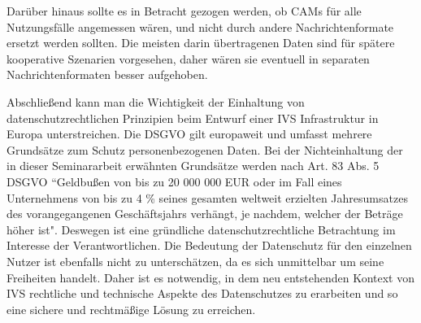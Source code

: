 Darüber hinaus sollte es in Betracht gezogen werden, ob CAMs für alle Nutzungsfälle angemessen wären, und nicht durch andere Nachrichtenformate ersetzt werden sollten. Die meisten darin übertragenen Daten sind für spätere kooperative Szenarien vorgesehen, daher wären sie eventuell in separaten Nachrichtenformaten besser aufgehoben. 

Abschließend kann man die Wichtigkeit der Einhaltung von datenschutzrechtlichen Prinzipien beim Entwurf einer IVS Infrastruktur in Europa unterstreichen. Die DSGVO gilt europaweit und umfasst mehrere Grundsätze zum Schutz personenbezogenen Daten. Bei der Nichteinhaltung der in dieser Seminararbeit erwähnten Grundsätze werden nach Art. 83 Abs. 5 DSGVO ``Geldbußen von bis zu 20 000 000 EUR oder im Fall eines Unternehmens von bis zu 4 \% seines gesamten weltweit erzielten Jahresumsatzes des vorangegangenen Geschäftsjahrs verhängt, je nachdem, welcher der Beträge höher ist". Deswegen ist eine gründliche datenschutzrechtliche Betrachtung im Interesse der Verantwortlichen. Die Bedeutung der Datenschutz für den einzelnen Nutzer ist ebenfalls nicht zu unterschätzen, da es sich unmittelbar um seine Freiheiten handelt. Daher ist es notwendig, in dem neu entstehenden Kontext von IVS rechtliche und technische Aspekte des Datenschutzes zu erarbeiten und so eine sichere und rechtmäßige Lösung zu erreichen.






